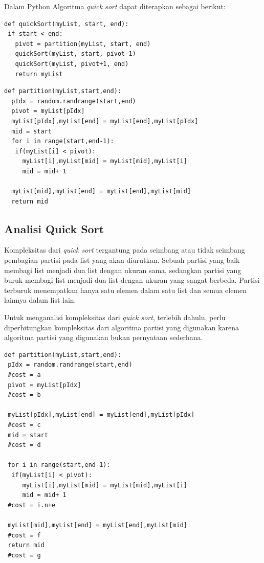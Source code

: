 \documentclass[12pt]{book}%
\begin{document}
\newpage{}
Dalam Python Algoritma \textit{quick sort} dapat diterapkan sebagai berikut:
\lstset{language=Python}
\label{lst:QuickSort}
\begin{lstlisting}[frame=single]
def quickSort(myList, start, end):
 if start < end:
   pivot = partition(myList, start, end)
   quickSort(myList, start, pivot-1)
   quickSort(myList, pivot+1, end)
   return myList
\end{lstlisting}

\lstset{language=Python}
\label{lst:Partition}
\begin{lstlisting}[frame=single]
def partition(myList,start,end):
  pIdx = random.randrange(start,end)
  pivot = myList[pIdx]
  myList[pIdx],myList[end] = myList[end],myList[pIdx]
  mid = start
  for i in range(start,end-1):
   if(myList[i] < pivot):    
	 myList[i],myList[mid] = myList[mid],myList[i]
	 mid = mid+ 1
	
  myList[mid],myList[end] = myList[end],myList[mid]
  return mid
\end{lstlisting}

\subsection{Analisi Quick Sort}
Kompleksitas dari \textit{quick sort} tergantung pada  seimbang atau tidak seimbang pembagian partisi pada list yang akan diurutkan. Sebuah partisi yang  baik membagi list menjadi dua list dengan ukuran sama, sedangkan partisi yang buruk membagi list menjadi dua list dengan ukuran yang sangat berbeda. Partisi terburuk menempatkan hanya satu elemen dalam satu list dan semua elemen lainnya dalam list lain. 

Untuk menganalisi kompleksitas dari \textit{quick sort}, terlebih dahulu, perlu diperhitungkan kompleksitas dari algoritma partisi yang digunakan karena algoritma partisi yang digunakan bukan pernyataan sederhana.

\lstset{language=Python}
\label{lst:Partition}
\begin{lstlisting}[frame=single]
def partition(myList,start,end):
 pIdx = random.randrange(start,end) 
 #cost = a
 pivot = myList[pIdx]
 #cost = b
 
 myList[pIdx],myList[end] = myList[end],myList[pIdx]
 #cost = c 
 mid = start
 #cost = d

 for i in range(start,end-1):
  if(myList[i] < pivot):
	 myList[i],myList[mid] = myList[mid],myList[i]
	 mid = mid+ 1
 #cost = i.n+e

 myList[mid],myList[end] = myList[end],myList[mid]
 #cost = f
 return mid
 #cost = g
\end{lstlisting}
\end{document}
